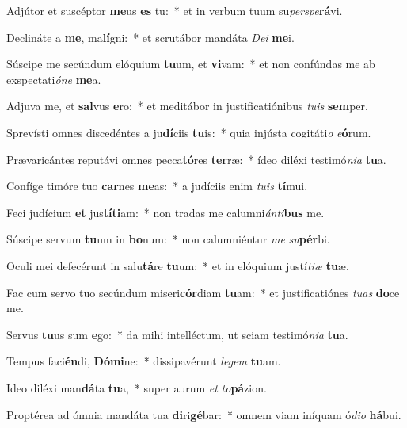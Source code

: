 \item Adjútor et suscéptor \textbf{me}us \textbf{es} tu:~* et in verbum tuum su\textit{per}\textit{spe}\textbf{rá}vi.
\item Declináte a \textbf{me}, ma\textbf{lí}gni:~* et scrutábor mandáta \textit{De}\textit{i} \textbf{me}i.
\item Súscipe me secúndum elóquium \textbf{tu}um, et \textbf{vi}vam:~* et non confúndas me ab exspectati\textit{ó}\textit{ne} \textbf{me}a.
\item Adjuva me, et \textbf{sal}vus \textbf{e}ro:~* et meditábor in justificatiónibus \textit{tu}\textit{is} \textbf{sem}per.
\item Sprevísti omnes discedéntes a ju\textbf{dí}ciis \textbf{tu}is:~* quia injústa cogitáti\textit{o} \textit{e}\textbf{ó}rum.
\item Prævaricántes reputávi omnes pecca\textbf{tó}res \textbf{ter}ræ:~* ídeo diléxi testimó\textit{ni}\textit{a} \textbf{tu}a.
\item Confíge timóre tuo \textbf{car}nes \textbf{me}as:~* a judíciis enim \textit{tu}\textit{is} \textbf{tí}mui.
\item Feci judícium \textbf{et} jus\textbf{tí}\textbf{ti}am:~* non tradas me calumni\textit{án}\textit{ti}\textbf{bus} me.
\item Súscipe servum \textbf{tu}um in \textbf{bo}num:~* non calumniéntur \textit{me} \textit{su}\textbf{pér}bi.
\item Oculi mei defecérunt in salu\textbf{tá}re \textbf{tu}um:~* et in elóquium justí\textit{ti}\textit{æ} \textbf{tu}æ.
\item Fac cum servo tuo secúndum miseri\textbf{cór}diam \textbf{tu}am:~* et justificatiónes \textit{tu}\textit{as} \textbf{do}ce me.
\item Servus \textbf{tu}us sum \textbf{e}go:~* da mihi intelléctum, ut sciam testimó\textit{ni}\textit{a} \textbf{tu}a.
\item Tempus faci\textbf{én}di, \textbf{Dó}\textbf{mi}ne:~* dissipavérunt \textit{le}\textit{gem} \textbf{tu}am.
\item Ideo diléxi man\textbf{dá}ta \textbf{tu}a,~* super aurum \textit{et} \textit{to}\textbf{pá}zion.
\item Proptérea ad ómnia mandáta tua \textbf{di}ri\textbf{gé}bar:~* omnem viam iníquam ó\textit{di}\textit{o} \textbf{há}bui.
